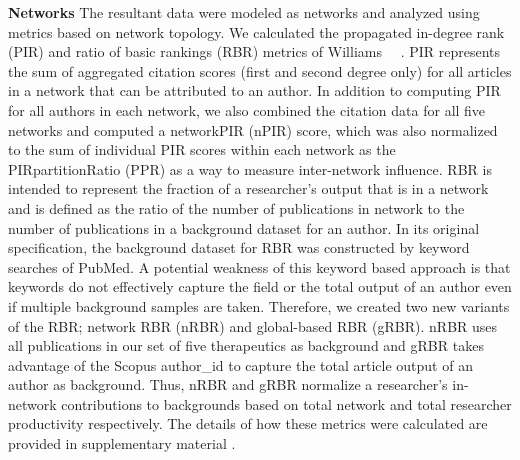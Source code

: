 \documentclass[10pt,letterpaper]{article}
\begin{document}
\textbf{Networks} The resultant data were modeled as networks and analyzed using metrics based on network topology. We calculated the propagated in-degree rank (PIR) and ratio of basic rankings (RBR) metrics of Williams ~~\cite{bibWilliams}. PIR represents the sum of aggregated citation scores (first and second degree only)  for all articles in a network that can be attributed to an author. In addition to computing PIR for all authors in each network, we also combined the citation data for all five networks and computed a networkPIR (nPIR) score, which was also normalized to the sum of individual PIR scores within each network as the PIRpartitionRatio (PPR) as a way to measure inter-network influence. RBR is intended to represent the fraction of a researcher's output that is in a network and is defined as the ratio of the number of publications in network to the number of publications in a background dataset for an author. In its original specification, the background dataset for RBR was constructed by keyword searches of PubMed. A potential weakness of this keyword based approach is that keywords do not effectively capture the field or the total output of an author even if multiple background samples are taken. Therefore, we created two new variants of the RBR; network RBR (nRBR) and global-based RBR (gRBR). nRBR uses all publications in our set of five therapeutics as background and gRBR takes advantage of the Scopus author\_id to capture the total article output of an author as background. Thus, nRBR and gRBR normalize a researcher's in-network contributions to backgrounds based on total network and total researcher productivity respectively. The details of how these metrics were calculated are provided in supplementary material .\\
\end{document}
